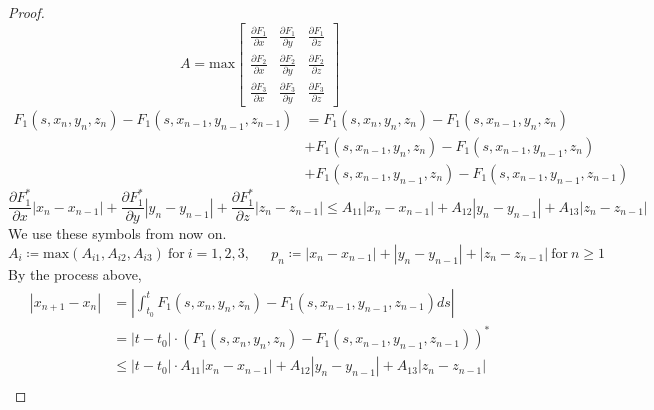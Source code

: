 \documentclass[a4paper,10pt]{article}
\begin{document}
\begin{proof}
        \begin{displaymath}
            A = \text{max}
            \begin{bmatrix}
                \frac{\partial F_1}{\partial x} & \frac{\partial F_1}{\partial y} & \frac{\partial F_1}{\partial z} \\
                \frac{\partial F_2}{\partial x} & \frac{\partial F_2}{\partial y} & \frac{\partial F_2}{\partial z} \\
                \frac{\partial F_3}{\partial x} & \frac{\partial F_3}{\partial y} & \frac{\partial F_3}{\partial z}
            \end{bmatrix}
        \end{displaymath}
        \begin{align*}
            F_1(s, x_{n}, y_{n}, z_{n}) - F_1(s, x_{n-1}, y_{n-1}, z_{n-1}) &= F_1(s, x_{n}, y_{n}, z_{n}) - F_1(s, x_{n-1}, y_n, z_n) \\
                                                                         &+ F_1(s, x_{n-1}, y_{n}, z_{n}) - F_1(s, x_{n-1}, y_{n-1}, z_n) \\
                                                                         &+ F_1(s, x_{n-1}, y_{n-1}, z_{n}) - F_1(s, x_{n-1}, y_{n-1}, z_{n-1})
        \end{align*}
        \begin{displaymath}
            \frac{\partial F_1^{*}}{\partial x} |x_{n} - x_{n-1}| + \frac{\partial F_1^{*}}{\partial y} |y_{n} - y_{n-1}| + \frac{\partial F_1^{*}}{\partial z} |z_{n} - z_{n-1}| \leq A_{11} |x_{n} - x_{n-1}| + A_{12} |y_{n} - y_{n-1}|+ A_{13} |z_{n} - z_{n-1}|
        \end{displaymath}
        We use these symbols from now on.
        \begin{displaymath}
            A_i \coloneqq \text{max}(A_{i1}, A_{i2}, A_{i3}) \ \text{for} \ i = 1, 2, 3, \quad \ \ p_n \coloneqq |x_{n} - x_{n-1}| + |y_{n} - y_{n-1}|+ |z_{n} - z_{n-1}| \ \text{for} \ n \geq 1
        \end{displaymath}
        By the process above,
        \begin{align*}
            |x_{n+1} - x_n| &= \left| \int_{t_0}^t F_1(s, x_{n}, y_{n}, z_{n}) - F_1(s, x_{n-1}, y_{n-1}, z_{n-1}) ds \right| \\
            &= |t - t_0| \cdot (F_1(s, x_{n}, y_{n}, z_{n}) - F_1(s, x_{n-1}, y_{n-1}, z_{n-1}))^{*} \\
            &\leq |t - t_0| \cdot A_{11} |x_{n} - x_{n-1}| + A_{12} |y_{n} - y_{n-1}|+ A_{13} |z_{n} - z_{n-1}| \\

\end{align*}
\end{proof}
\end{document}
